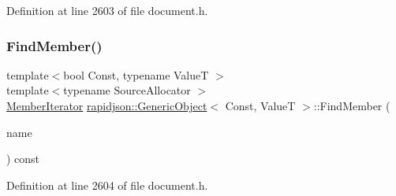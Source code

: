 Definition at line 2603 of file document.\+h.


\begin{DoxyCode}{0}

\end{DoxyCode}
\mbox{\label{classrapidjson_1_1_generic_object_ae4681bdff872d25f5100bc53d8a48bb3}} 
\subsubsection{\texorpdfstring{FindMember()}{FindMember()}\hspace{0.1cm}{\footnotesize\ttfamily [2/2]}}
{\footnotesize\ttfamily template$<$bool Const, typename ValueT $>$ \\
template$<$typename Source\+Allocator $>$ \\
\mbox{\hyperlink{classrapidjson_1_1_generic_object_a598fd1d5f55289eca275847f0e8ef295}{Member\+Iterator}} \mbox{\hyperlink{classrapidjson_1_1_generic_object}{rapidjson\+::\+Generic\+Object}}$<$ Const, ValueT $>$\+::Find\+Member (\begin{DoxyParamCaption}\item[{\mbox{\hyperlink{classrapidjson_1_1_generic_object_a3524fcb5f36c034aabd8afa19fc16d9e}{const}} \mbox{\hyperlink{classrapidjson_1_1_generic_value}{Generic\+Value}}$<$ \mbox{\hyperlink{classrapidjson_1_1_generic_object_ac412c8d073aa02f622b3904e4195425c}{Encoding\+Type}}, Source\+Allocator $>$ \&}]{name }\end{DoxyParamCaption}) const}



Definition at line 2604 of file document.\+h.


\begin{DoxyCode}{0}

\end{DoxyCode}
\mbox{\label{classrapidjson_1_1_generic_object_a10fd0c5b5ef61479725590b78c006234}} 
